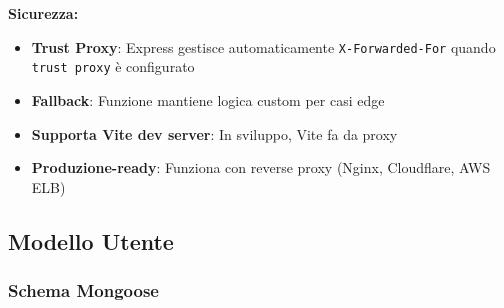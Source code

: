 \documentclass[11pt,a4paper]{article}
\newcommand{\code}[1]{\texttt{#1}}
\begin{document}
\textbf{Sicurezza:}
\begin{itemize}
    \item \textbf{Trust Proxy}: Express gestisce automaticamente \code{X-Forwarded-For} quando \code{trust proxy} è configurato
    \item \textbf{Fallback}: Funzione mantiene logica custom per casi edge
    \item \textbf{Supporta Vite dev server}: In sviluppo, Vite fa da proxy
    \item \textbf{Produzione-ready}: Funziona con reverse proxy (Nginx, Cloudflare, AWS ELB)
\end{itemize}

\subsection{Modello Utente}

\subsubsection{Schema Mongoose}
\end{document}
